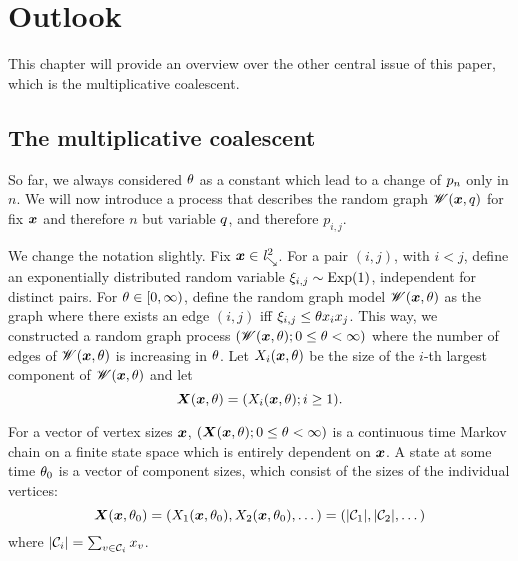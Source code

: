 
\chapter{Outlook} \label{C: outlook}

This chapter will provide an overview over the other central issue of this paper,
which is the multiplicative coalescent.

\section{The multiplicative coalescent} \label{S: multiplicative coalescent}

So far, we always considered $\theta$ as a constant which lead to a change of $p_n$ only in $n$.
We will now introduce a process that describes the random graph $\mathscr{W}(\boldsymbol{x}, q)$ for fix $\boldsymbol{x}$ and therefore $n$
but variable $q$, and therefore $p_{i,j}$.

We change the notation slightly.
Fix $\boldsymbol{x} \in \mathit{l}^2_{\searrow}$.
For a pair $(i,j)$, with $i < j$, 
define an exponentially distributed random variable $\xi_{i,j} \sim \operatorname*{Exp}(1)$,
independent for distinct pairs.
For $\theta \in [0, \infty)$, define the random graph model $\mathscr{W}(\boldsymbol{x}, \theta)$ as the graph where there exists an edge $(i,j)$ 
iff $\xi_{i,j} \leq \theta x_i x_j$.
This way, we constructed a random graph process $(\mathscr{W}(\boldsymbol{x}, \theta); 0 \leq \theta < \infty)$ 
where the number of edges of $\mathscr{W}(\boldsymbol{x}, \theta)$ is increasing in $\theta$.
Let $X_i(\boldsymbol{x}, \theta)$ be the size of the $i$-th largest component of $\mathscr{W}(\boldsymbol{x}, \theta)$ and let
\begin{equation}
	\boldsymbol{X}(\boldsymbol{x}, \theta) = (X_i(\boldsymbol{x}, \theta); i \geq 1).
\end{equation}

For a vector of vertex sizes $\boldsymbol{x}$, $(\boldsymbol{X}(\boldsymbol{x}, \theta); 0 \leq \theta < \infty)$ is a continuous time Markov chain
on a finite state space which is entirely dependent on $\boldsymbol{x}$.
A state at some time $\theta_0$ is a vector of component sizes, which consist of the sizes of the individual vertices:
\begin{equation}
	\boldsymbol{X}(\boldsymbol{x}, \theta_0) = (X_1(\boldsymbol{x}, \theta_0), X_2(\boldsymbol{x}, \theta_0), \dots) = (|\mathcal{C}_1|, |\mathcal{C}_2|, \dots)
\end{equation}
where $|\mathcal{C}_i| = \sum_{v \in \mathcal{C}_i} x_v$.

